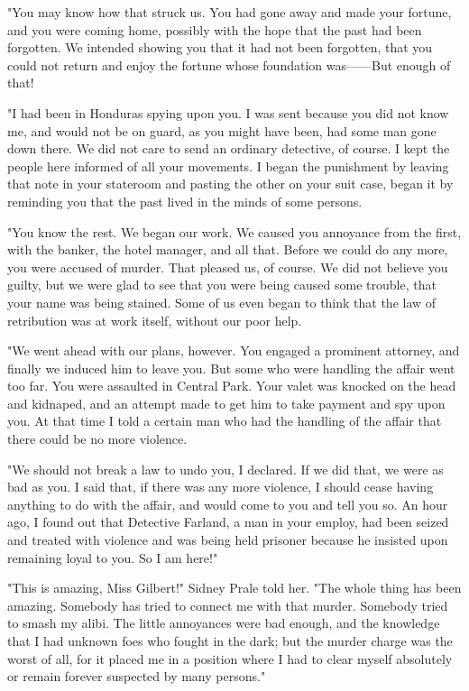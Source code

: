\documentclass{novel}
\begin{document}
"You may know how that struck us. You had gone away and made your fortune, and you were coming home, possibly with the hope that the past had been forgotten. We intended showing you that it had not been forgotten, that you could not return and enjoy the fortune whose foundation was------But enough of that!

"I had been in Honduras spying upon you. I was sent because you did not know me, and would not be on guard, as you might have been, had some man gone down there. We did not care to send an ordinary detective, of course. I kept the people here informed of all your movements. I began the punishment by leaving that note in your stateroom and pasting the other on your suit case, began it by reminding you that the past lived in the minds of some persons.

"You know the rest. We began our work. We caused you annoyance from the first, with the banker, the hotel manager, and all that. Before we could do any more, you were accused of murder. That pleased us, of course. We did not believe you guilty, but we were glad to see that you were being caused some trouble, that your name was being stained. Some of us even began to think that the law of retribution was at work itself, without our poor help.

"We went ahead with our plans, however. You engaged a prominent attorney, and finally we induced him to leave you. But some who were handling the affair went too far. You were assaulted in Central Park. Your valet was knocked on the head and kidnaped, and an attempt made to get him to take payment and spy upon you. At that time I told a certain man who had the handling of the affair that there could be no more violence.

"We should not break a law to undo you, I declared. If we did that, we were as bad as you. I said that, if there was any more violence, I should cease having anything to do with the affair, and would come to you and tell you so. An hour ago, I found out that Detective Farland, a man in your employ, had been seized and treated with violence and was being held prisoner because he insisted upon remaining loyal to you. So I am here!"

"This is amazing, Miss Gilbert!" Sidney Prale told her. "The whole thing has been amazing. Somebody has tried to connect me with that murder. Somebody tried to smash my alibi. The little annoyances were bad enough, and the knowledge that I had unknown foes who fought in the dark; but the murder charge was the worst of all, for it placed me in a position where I had to clear myself absolutely or remain forever suspected by many persons."
\end{document}
